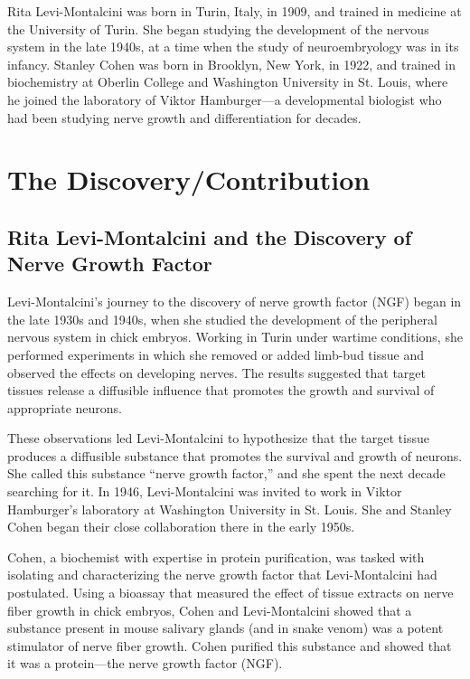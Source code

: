 Rita Levi-Montalcini was born in Turin, Italy, in 1909, and trained in medicine at the University of Turin. She began studying the development of the nervous system in the late 1940s, at a time when the study of neuroembryology was in its infancy. Stanley Cohen was born in Brooklyn, New York, in 1922, and trained in biochemistry at Oberlin College and Washington University in St. Louis, where he joined the laboratory of Viktor Hamburger---a developmental biologist who had been studying nerve growth and differentiation for decades.

\section{The Discovery/Contribution}

\subsection{Rita Levi-Montalcini and the Discovery of Nerve Growth Factor}

Levi-Montalcini's journey to the discovery of nerve growth factor (NGF) began in the late 1930s and 1940s, when she studied the development of the peripheral nervous system in chick embryos. Working in Turin under wartime conditions, she performed experiments in which she removed or added limb-bud tissue and observed the effects on developing nerves. The results suggested that target tissues release a diffusible influence that promotes the growth and survival of appropriate neurons.

These observations led Levi-Montalcini to hypothesize that the target tissue produces a diffusible substance that promotes the survival and growth of neurons. She called this substance ``nerve growth factor,'' and she spent the next decade searching for it. In 1946, Levi-Montalcini was invited to work in Viktor Hamburger's laboratory at Washington University in St. Louis. She and Stanley Cohen began their close collaboration there in the early 1950s.

Cohen, a biochemist with expertise in protein purification, was tasked with isolating and characterizing the nerve growth factor that Levi-Montalcini had postulated. Using a bioassay that measured the effect of tissue extracts on nerve fiber growth in chick embryos, Cohen and Levi-Montalcini showed that a substance present in mouse salivary glands (and in snake venom) was a potent stimulator of nerve fiber growth. Cohen purified this substance and showed that it was a protein---the nerve growth factor (NGF).

